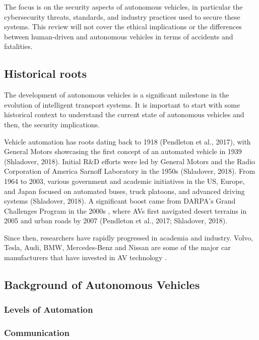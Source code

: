The focus is on the security aspects of autonomous vehicles, in particular the cybersecurity threats, standards, and industry practices used to secure these systems.
This review will not cover the ethical implications or the differences between human-driven and autonomous vehicles in terms of accidents and fatalities.

\subsection{Historical roots}\label{subsec:historical-roots}

The development of autonomous vehicles is a significant milestone in the evolution of intelligent transport systems.
It is important to start with some historical context to understand the current state of autonomous vehicles and then,
the security implications.

Vehicle automation has roots dating back to 1918 (Pendleton et al., 2017),
with General Motors showcasing the first concept of an automated vehicle in 1939 (Shladover, 2018).
Initial R\&D efforts were led by General Motors and the Radio Corporation of America Sarnoff Laboratory in the 1950s
(Shladover, 2018).
From 1964 to 2003, various government and academic initiatives in the US, Europe,
and Japan focused on automated buses, truck platoons, and advanced driving systems
(Shladover, 2018).
A significant boost came from DARPA’s Grand Challenges Program in the 2000s \cite{darpa_grand_challenges_book},
where AVs first navigated desert terrains in 2005 and urban roads by 2007 (Pendleton et al., 2017; Shladover, 2018).

Since then, researchers have rapidly progressed in academia and industry.
Volvo, Tesla, Audi, BMW,
Mercedes-Benz and Nissan are some of the major car manufacturers that have invested in AV technology \cite{faisal2019understanding}.

\subsection{Background of Autonomous Vehicles}\label{subsec:background-and-significance-of-autonomous-vehicles}
\subsubsection{Levels of Automation}\label{subsubsec:levels-of-automation}
\subsubsection{Communication}\label{subsubsec:communication}

